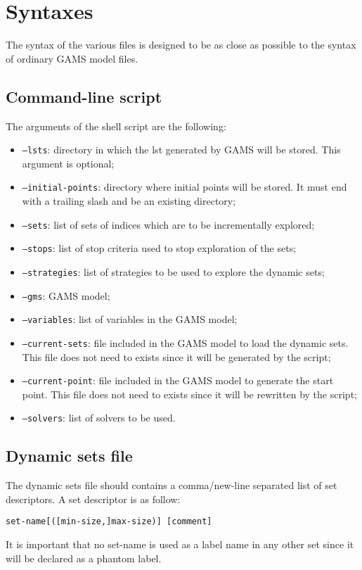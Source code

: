 \section*{Syntaxes}

The syntax of the various files is designed to be as close as possible to the
syntax of ordinary GAMS model files.

\subsection*{Command-line script}

The arguments of the shell script are the following:\\
\begin{itemize}
\item \texttt{--lsts}: directory in which the lst generated by GAMS will be
  stored. This argument is optional;
\item \texttt{--initial-points}: directory where initial points will be
  stored. It must end with a trailing slash and be an existing directory;
\item \texttt{--sets}: list of sets of indices which are to be
  incrementally explored;
\item \texttt{--stops}: list of stop criteria used to stop exploration of
  the sets;
\item \texttt{--strategies}: list of strategies to be used to explore the dynamic
  sets;
\item \texttt{--gms}: GAMS model;
\item \texttt{--variables}: list of variables in the GAMS model;
\item \texttt{--current-sets}: file included in the GAMS model to load the
  dynamic sets. This file does not need to exists since it will be generated by
  the script;
\item \texttt{--current-point}: file included in the GAMS model to generate the
  start point. This file does not need to exists since it will be rewritten by
  the script;
\item \texttt{--solvers}: list of solvers to be used.
\end{itemize}

\subsection*{Dynamic sets file}

The dynamic sets file should contains a comma/new-line separated list of set descriptors.
A set descriptor is as follow:
\begin{center}
  \texttt{set-name[([min-size,]max-size)] [comment]}
\end{center}
It is important that no set-name is used as a label name in any other set since
it will be declared as a phantom label.

